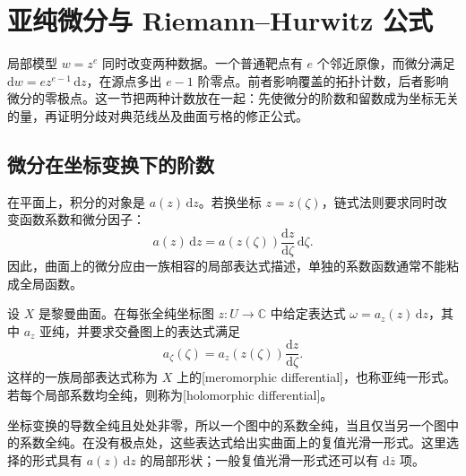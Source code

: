 
% 
% 

\section{亚纯微分与 Riemann–Hurwitz 公式}
\label{g4:sec:0203}

局部模型 \(w=z^e\) 同时改变两种数据。一个普通靶点有 \(e\) 个邻近原像，而微分满足 \(\mathrm{d}w=e z^{e-1}\,\mathrm{d}z\)，在源点多出 \(e-1\) 阶零点。前者影响覆盖的拓扑计数，后者影响微分的零极点。这一节把两种计数放在一起：先使微分的阶数和留数成为坐标无关的量，再证明分歧对典范线丛及曲面亏格的修正公式。

\subsection{微分在坐标变换下的阶数}
\label{g4:subsec:0203:01}
在平面上，积分的对象是 \(a(z)\,\mathrm{d}z\)。若换坐标 \(z=z(\zeta)\)，链式法则要求同时改变函数系数和微分因子：
\[
	a(z)\,\mathrm{d}z
	=a(z(\zeta))\frac{\mathrm{d}z}{\mathrm{d}\zeta}\,\mathrm{d}\zeta.
\]
因此，曲面上的微分应由一族相容的局部表达式描述，单独的系数函数通常不能粘成全局函数。

\begin{definition}
	\label{g4:def:0203:meromorphic-differential}
	设 \(X\) 是黎曼曲面。在每张全纯坐标图 \(z:U\rightarrow\mathbb C\) 中给定表达式 \(\omega=a_z(z)\,\mathrm{d}z\)，其中 \(a_z\) 亚纯，并要求交叠图上的表达式满足
	\begin{equation}
		\label{g4:eq:0203:differential-transition}
		a_\zeta(\zeta)=a_z(z(\zeta))\frac{\mathrm{d}z}{\mathrm{d}\zeta}.
	\end{equation}
	这样的一族局部表达式称为 \(X\) 上的[meromorphic differential]，也称亚纯一形式。若每个局部系数均全纯，则称为[holomorphic differential]。
\end{definition}

坐标变换的导数全纯且处处非零，所以一个图中的系数全纯，当且仅当另一个图中的系数全纯。在没有极点处，这些表达式给出实曲面上的复值光滑一形式。这里选择的形式具有 \(a(z)\,\mathrm{d}z\) 的局部形状；一般复值光滑一形式还可以有 \(\mathrm{d}\overline z\) 项。

